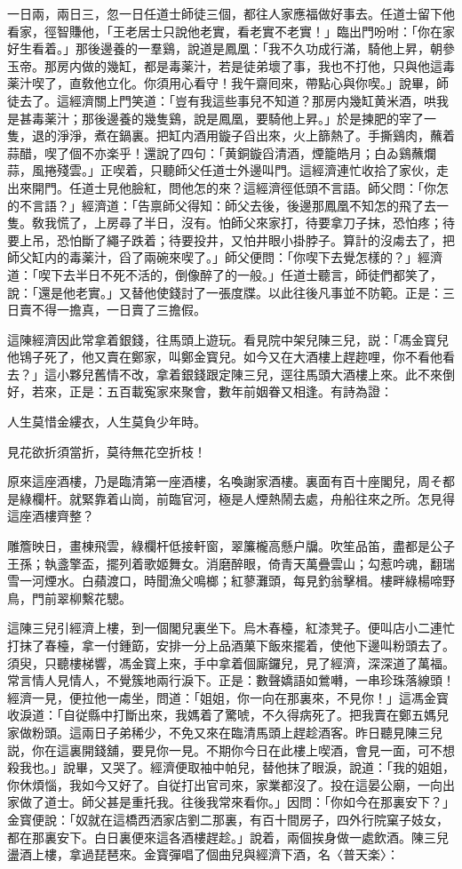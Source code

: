 一日兩，兩日三，忽一日任道士師徒三個，都往人家應福做好事去。任道士留下他看家，徑智賺他，「王老居士只說他老實，看老實不老實！」臨出門吩咐：「你在家好生看着。」那後邊養的一羣鷄，說道是鳳凰：「我不久功成行滿，騎他上昇，朝參玉帝。那房内做的幾缸，都是毒薬汁，若是徒弟壞了事，我也不打他，只與他這毒薬汁喫了，直敎他立化。你須用心看守！我午齋囘來，帶點心與你喫。」說畢，師徒去了。這經濟關上門笑道：「豈有我這些事兒不知道？那房内幾缸黄米酒，哄我是甚毒薬汁；那後邊養的幾隻鷄，說是鳳凰，要騎他上昇。」於是揀肥的宰了一隻，退的淨淨，煮在鍋裏。把缸内酒用鏇子舀出來，火上篩熱了。手撕鷄肉，蘸着蒜醋，喫了個不亦楽乎！還說了四句：「黄銅鏇舀清酒，煙籠皓月；白ゐ鷄蘸爛蒜，風捲殘雲。」正喫着，只聽師父任道士外邊叫門。這經濟連忙收拾了家伙，走出來開門。任道士見他臉紅，問他怎的來？這經濟徑低頭不言語。師父問：「你怎的不言語？」經濟道：「告禀師父得知：師父去後，後邊那鳳凰不知怎的飛了去一隻。敎我慌了，上房尋了半日，沒有。怕師父來家打，待要拿刀子抹，恐怕疼；待要上吊，恐怕斷了繩子跌着；待要投井，又怕井眼小掛脖子。算計的沒䖏去了，把師父缸内的毒薬汁，舀了兩碗來喫了。」師父便問：「你喫下去覺怎樣的？」經濟道：「喫下去半日不死不活的，倒像醉了的一般。」任道士聽言，師徒們都笑了，說：「還是他老實。」又替他使錢討了一張度牒。以此往後凡事並不防範。正是：三日賣不得一擔真，一日賣了三擔假。

這陳經濟因此常拿着銀錢，往馬頭上遊玩。看見院中架兒陳三兒，説：「馮金寳兒他鴇子死了，他又賣在鄭家，叫鄭金寳兒。如今又在大酒樓上趕趂哩，你不看他看去？」這小夥兒舊情不改，拿着銀錢跟定陳三兒，逕往馬頭大酒樓上來。此不來倒好，若來，正是：五百載寃家來聚會，數年前姻眷又相逢。有詩為證：

人生莫惜金縷衣，人生莫負少年時。

見花欲折須當折，莫待無花空折枝！

原來這座酒樓，乃是臨清第一座酒樓，名喚謝家酒樓。裏面有百十座閣兒，周そ都是綠欄杆。就緊靠着山崗，前臨官河，極是人煙熱鬧去處，舟船往來之所。怎見得這座酒樓齊整？

雕簷映日，畫棟飛雲，綠欄杆低接軒窗，翠簾櫳高懸户牖。吹笙品笛，盡都是公子王孫；執盞擎盃，擺列着歌姬舞女。消磨醉眼，倚青天萬疊雲山；勾惹吟魂，翻瑞雪一河煙水。白蘋渡口，時聞漁父鳴榔；紅蓼灘頭，每見釣翁擊楫。樓畔綠楊啼野鳥，門前翠柳繫花驄。

這陳三兒引經濟上樓，到一個閣兒裏坐下。烏木春檯，紅漆凳子。便叫店小二連忙打抹了春檯，拿一付鍾筯，安排一分上品酒菓下飯來擺着，使他下邊叫粉頭去了。須臾，只聽樓梯響，馮金寳上來，手中拿着個廝鑼兒，見了經濟，深深道了萬福。常言情人見情人，不覺簇地兩行淚下。正是：數聲嬌語如鶯囀，一串珍珠落線頭！經濟一見，便拉他一䖏坐，問道：「姐姐，你一向在那裏來，不見你！」這馮金寳收淚道：「自従縣中打斷出來，我媽着了驚唬，不久得病死了。把我賣在鄭五媽兒家做粉頭。這兩日子弟稀少，不免又來在臨清馬頭上趕趁酒客。昨日聽見陳三兒説，你在這裏開錢舖，要見你一見。不期你今日在此樓上喫酒，會見一面，可不想殺我也。」說畢，又哭了。經濟便取袖中帕兒，替他抹了眼淚，說道：「我的姐姐，你休煩惱，我如今又好了。自従打出官司來，家業都沒了。投在這晏公廟，一向出家做了道士。師父甚是重托我。往後我常來看你。」因問：「你如今在那裏安下？」金寳便說：「奴就在這橋西洒家店劉二那裏，有百十間房子，四外行院窠子妓女，都在那裏安下。白日裏便來這各酒樓趕趁。」說着，兩個挨身做一處飲酒。陳三兒盪酒上樓，拿過琵琶來。金寳彈唱了個曲兒與經濟下酒，名〈普天楽〉：

